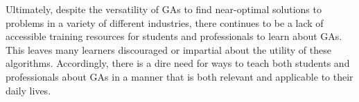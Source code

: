 \documentclass{article}
\begin{document}
Ultimately, despite the versatility of GAs to find near-optimal solutions to problems in a variety of different industries, there continues to be a lack of accessible training resources for students and professionals to learn about GAs. This leaves many learners discouraged or impartial about the utility of these algorithms. Accordingly, there is a dire need for ways to teach both students and professionals about GAs in a manner that is both relevant and applicable to their daily lives.
\end{document}
